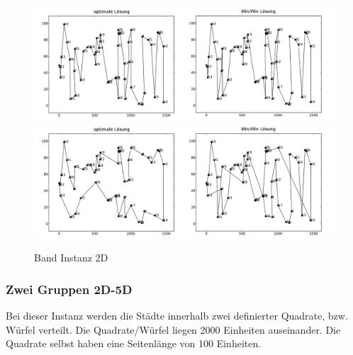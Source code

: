 \documentclass[11pt,a4paper]{article}
\begin{document}
\begin{figure}[H]
    \centering
    \includegraphics[width=16cm]{gfx/belt_hpp_comparison}
    \includegraphics[width=16cm]{gfx/belt_tsp_comparison}
    \caption{Band Instanz 2D}
    \label{img:belt_comparison}
\end{figure}

\subsubsection{Zwei Gruppen 2D-5D}
Bei dieser Instanz werden die Städte innerhalb zwei definierter Quadrate, bzw. Würfel verteilt. Die Quadrate/Würfel liegen 2000 Einheiten auseinander. Die Quadrate selbst haben eine Seitenlänge von 100 Einheiten.
\end{document}
